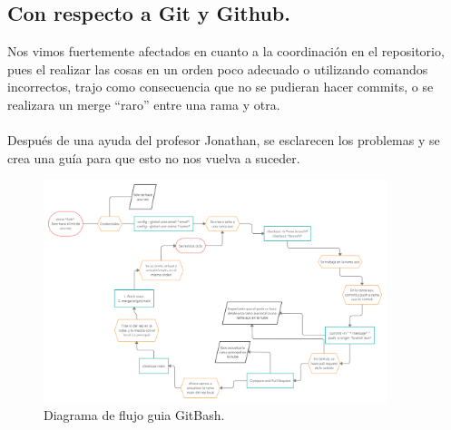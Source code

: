 \documentclass{article}
\begin{document}
\subsection{Con respecto a Git y Github.}
Nos vimos fuertemente afectados en cuanto a la coordinación en el repositorio, pues el realizar las cosas en un orden poco adecuado o utilizando comandos incorrectos, trajo como consecuencia que no se pudieran hacer commits, o se realizara un merge “raro” entre una rama y otra.
\\
\\
Después de una ayuda del profesor Jonathan, se esclarecen los problemas y se crea una guía para que esto no nos vuelva a suceder.
\begin{figure}[h]
  \includegraphics[width=10cm]{Guia_GitHub_GitBash.jpg}
  \centering
  \caption{Diagrama de flujo guia GitBash.}
  \label{fig:guia}
\end{figure}


\end{document}
